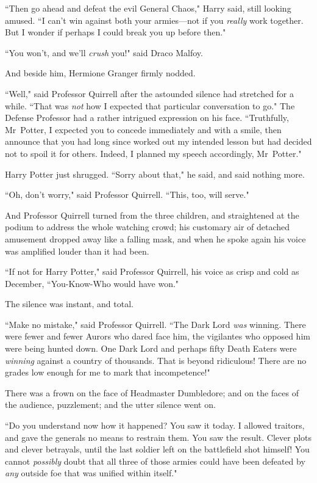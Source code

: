 ``Then go ahead and defeat the evil General Chaos," Harry said, still looking amused. ``I can't win against both your armies—not if you \emph{really} work together. But I wonder if perhaps I could break you up before then."

``You won't, and we'll \emph{crush} you!" said Draco Malfoy.

And beside him, Hermione Granger firmly nodded.

``Well," said Professor Quirrell after the astounded silence had stretched for a while. ``That was \emph{not} how I expected that particular conversation to go." The Defense Professor had a rather intrigued expression on his face. ``Truthfully, Mr~Potter, I expected you to concede immediately and with a smile, then announce that you had long since worked out my intended lesson but had decided not to spoil it for others. Indeed, I planned my speech accordingly, Mr~Potter."

Harry Potter just shrugged. ``Sorry about that," he said, and said nothing more.

``Oh, don't worry," said Professor Quirrell. ``This, too, will serve."

And Professor Quirrell turned from the three children, and straightened at the podium to address the whole watching crowd; his customary air of detached amusement dropped away like a falling mask, and when he spoke again his voice was amplified louder than it had been.

``If not for Harry Potter," said Professor Quirrell, his voice as crisp and cold as December, ``You-Know-Who would have won."

The silence was instant, and total.

\later

``Make no mistake," said Professor Quirrell. ``The Dark Lord \emph{was} winning. There were fewer and fewer Aurors who dared face him, the vigilantes who opposed him were being hunted down. One Dark Lord and perhaps fifty Death Eaters were \emph{winning} against a country of thousands. That is beyond ridiculous! There are no grades low enough for me to mark that incompetence!"

There was a frown on the face of Headmaster Dumbledore; and on the faces of the audience, puzzlement; and the utter silence went on.

``Do you understand now how it happened? You saw it today. I allowed traitors, and gave the generals no means to restrain them. You saw the result. Clever plots and clever betrayals, until the last soldier left on the battlefield shot himself! You cannot \emph{possibly} doubt that all three of those armies could have been defeated by \emph{any} outside foe that was unified within itself."

